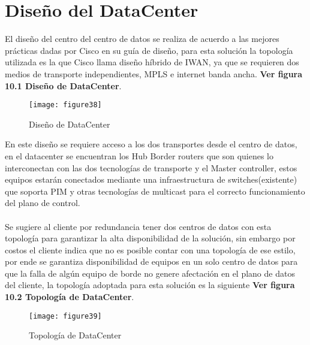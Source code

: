\chapter{Diseño del DataCenter}
\label{cha:Diseño del DataCenter}

El diseño del centro del centro de datos se realiza de acuerdo a las mejores prácticas dadas por Cisco en su guía de diseño, para esta solución la topología utilizada es la que Cisco llama diseño híbrido de IWAN, ya que se requieren dos medios de transporte independientes, MPLS e internet banda ancha. \textbf{Ver figura 10.1 Diseño de DataCenter}.
\begin{figure}[htbp]
  \centering
    {\texttt{[image: figure38]}}%
  \caption{Diseño de DataCenter}
  \label{fig:fig2subfig}
\end{figure}

En este diseño se requiere acceso a los dos transportes desde el centro de datos, en el datacenter se encuentran los Hub Border routers que son quienes lo interconectan con las dos tecnologías de transporte y el Master controller, estos equipos estarán conectados mediante una infraestructura de switches(existente) que soporta PIM y otras tecnologías de multicast para el correcto funcionamiento del plano de control.
\\
\\
Se sugiere al cliente por redundancia tener dos centros de datos con esta topología para garantizar la alta disponibilidad de la solución, sin embargo por costos el cliente indica que no es posible contar con una topología de ese estilo, por ende se garantiza disponibilidad de equipos en un solo centro de datos para que la falla de algún equipo de borde no genere afectación en el plano de datos del cliente, la topología adoptada para esta solución es la siguiente \textbf{Ver figura 10.2 Topología de DataCenter}.

\begin{figure}[htbp]
  \centering
    {\texttt{[image: figure39]}}%
  \caption{Topología de DataCenter}
  \label{fig:fig2subfig}
\end{figure}

